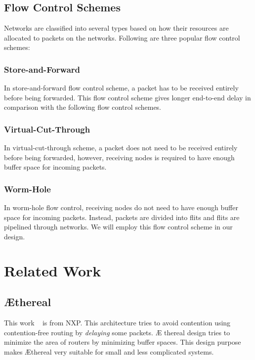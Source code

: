 \documentclass[conference, twocolumn]{IEEEtran}
\theoremstyle{definition}
\begin{document}
\subsection{Flow Control Schemes}
Networks are classified into several types based on how their resources are
allocated to packets on the networks. Following are three popular flow control
schemes:
\subsubsection{Store-and-Forward}
In store-and-forward flow control scheme, a packet has to be received entirely
before being forwarded. This flow control scheme gives longer end-to-end delay
in comparison with the following flow control schemes.
\subsubsection{Virtual-Cut-Through}
In virtual-cut-through scheme, a packet does not need to be received entirely
before being forwarded, however, receiving nodes is required to have enough
buffer space for incoming packets.
\subsubsection{Worm-Hole}
In worm-hole flow control, receiving nodes do not need to have enough buffer
space for incoming packets. Instead, packets are divided into flits and flits
are pipelined through networks. We will employ this flow control scheme in our
design.
\section{Related Work}
\subsection{\AE thereal}
This work ~\cite{Goossens_chapter4} is from NXP. This architecture tries to
avoid contention using contention-free routing by {\em delaying} some packets. \AE
thereal design tries to minimize the area of routers by minimizing buffer
spaces. This design purpose makes \AE thereal very suitable for small and less
complicated systems.
\end{document}
